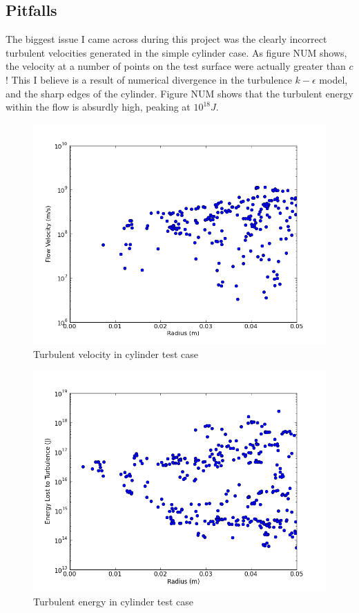 \documentclass[12pt]{article}
\begin{document}
\subsection{Pitfalls}
The biggest issue I came across during this project was the clearly incorrect 
turbulent velocities generated in the simple cylinder case.  As figure NUM 
shows, the velocity at a number of points on the test surface were actually
greater than $c$!  This I believe is a result of numerical divergence in the
turbulence $k-\epsilon$ model, and the sharp edges of the cylinder. Figure NUM
shows that the turbulent energy within the flow is absurdly high, peaking at
$10^{18}J$.

\begin{figure}[H]
\centering
\includegraphics[width=5in, clip=true, trim=0in 0in 0.5in 0.5in]{../images/cylinder_velocity_profile.png}
\caption{Turbulent velocity in cylinder test case}
\end{figure}

\begin{figure}[H]
\centering
\includegraphics[width=5in, clip=true, trim=0in 0in 0.5in 0.5in]{../images/cylinder_turb_profile.png}
\caption{Turbulent energy in cylinder test case}
\end{figure}
\end{document}
